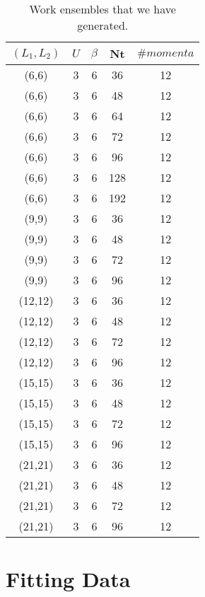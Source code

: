 \begin{table}[h]
    \centering
    \begin{tabular}{ccccc}
        $(L_1,L_2)$ & $U$ & $\beta$ & Nt & $\#momenta$ \\
        \hline
        (6,6) & 3 & 6 & 36 & 12
        \\
        (6,6) & 3 & 6 & 48 & 12
        \\
        (6,6) & 3 & 6 & 64 & 12
        \\
        (6,6) & 3 & 6 & 72 & 12
        \\
        (6,6) & 3 & 6 & 96 & 12
        \\
        (6,6) & 3 & 6 & 128 & 12
        \\
        (6,6) & 3 & 6 & 192 & 12
        \\
        \hline
        (9,9) & 3 & 6 & 36 & 12
        \\
        (9,9) & 3 & 6 & 48 & 12
        \\
        (9,9) & 3 & 6 & 72 & 12
        \\
        (9,9) & 3 & 6 & 96 & 12
        \\
        \hline
        (12,12) & 3 & 6 & 36 & 12
        \\
        (12,12) & 3 & 6 & 48 & 12
        \\
        (12,12) & 3 & 6 & 72 & 12
        \\
        (12,12) & 3 & 6 & 96 & 12
        \\
        \hline
        (15,15) & 3 & 6 & 36 & 12
        \\
        (15,15) & 3 & 6 & 48 & 12
        \\
        (15,15) & 3 & 6 & 72 & 12
        \\
        (15,15) & 3 & 6 & 96 & 12
        \\
        \hline
        (21,21) & 3 & 6 & 36 & 12
        \\
        (21,21) & 3 & 6 & 48 & 12
        \\
        (21,21) & 3 & 6 & 72 & 12
        \\
        (21,21) & 3 & 6 & 96 & 12
        \\
        \hline
    \end{tabular}
    \caption{Work ensembles that we have generated.}
    \label{tab:work_ensembles}
  \end{table}

\section{Fitting Data}

